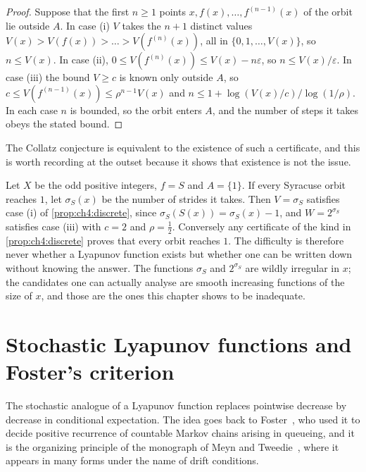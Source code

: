 \begin{proof}
Suppose that the first $n\ge1$ points $x,f(x),\dots,f^{(n-1)}(x)$ of the orbit lie outside $A$. In case (i) $V$ takes the $n+1$ distinct values $V(x)>V(f(x))>\dots>V(f^{(n)}(x))$, all in $\{0,1,\dots,V(x)\}$, so $n\le V(x)$. In case (ii), $0\le V(f^{(n)}(x))\le V(x)-n\varepsilon$, so $n\le V(x)/\varepsilon$. In case (iii) the bound $V\ge c$ is known only outside $A$, so $c\le V(f^{(n-1)}(x))\le\rho^{n-1}V(x)$ and $n\le1+\log(V(x)/c)/\log(1/\rho)$. In each case $n$ is bounded, so the orbit enters $A$, and the number of steps it takes obeys the stated bound.
\end{proof}

The Collatz conjecture is equivalent to the existence of such a certificate,
and this is worth recording at the outset because it shows that existence is
not the issue.

\begin{remark}
\label{rem:ch4:exists}
Let $X$ be the odd positive integers, $f=S$ and $A=\{1\}$.  If every Syracuse
orbit reaches $1$, let $\sigma_S(x)$ be the number of strides it takes.  Then
$V=\sigma_S$ satisfies case (i) of \cref{prop:ch4:discrete}, since
$\sigma_S(S(x))=\sigma_S(x)-1$, and $W=2^{\sigma_S}$ satisfies case (iii) with
$c=2$ and $\rho=\tfrac12$.  Conversely any certificate of the kind in
\cref{prop:ch4:discrete} proves that every orbit reaches $1$.  The difficulty
is therefore never whether a Lyapunov function exists but whether one can be
written down without knowing the answer.  The functions $\sigma_S$ and
$2^{\sigma_S}$ are wildly irregular in $x$; the candidates one can actually
analyse are smooth increasing functions of the size of $x$, and those are the ones this
chapter shows to be inadequate.
\end{remark}

\section[Stochastic Lyapunov functions and Foster's criterion]{Stochastic Lyapunov functions and\\ Foster's criterion}
\label{sec:ch4:foster}

The stochastic analogue of a Lyapunov function replaces pointwise decrease by
decrease in conditional expectation.  The idea goes back to
Foster~\cite{foster1953}, who used it to decide positive recurrence of
countable Markov chains arising in queueing, and it is the organizing
principle of the monograph of Meyn and Tweedie~\cite{meyn1993}, where it
appears in many forms under the name of drift conditions.

